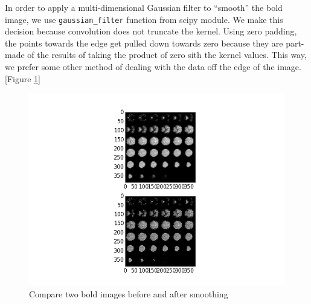 \par \indent In order to apply a multi-dimensional Gaussian filter to ``smooth''
the bold image, we use \texttt{gaussian\_filter} function from scipy module. 
We make this decision because convolution does not truncate the kernel. Using
zero padding, the points towards the edge get pulled down towards zero because
they are part-made of the results of taking the product of zero sith the kernel
values. This way, we prefer some other method of dealing with the data off the
edge of the image. [Figure \ref{fig:smoothing}]

\begin{figure}[!ht]
\centering
\includegraphics[width=120mm]{images/smooth_fig.png}
\caption{Compare two bold images before and after smoothing}
\label{fig:smoothing}
\end{figure}

